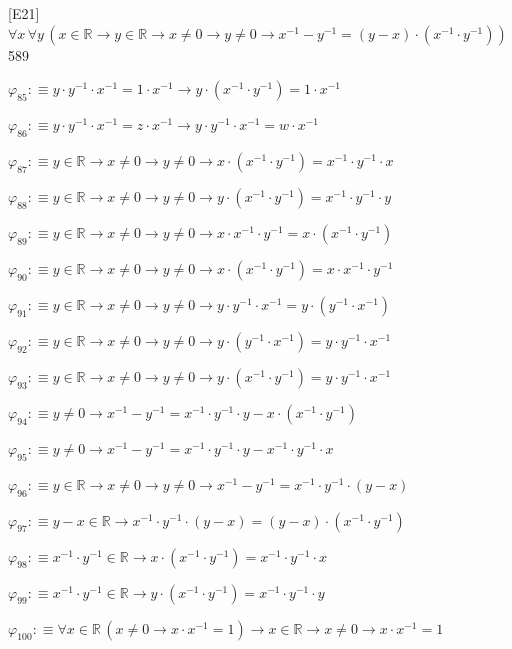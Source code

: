 \begin{fullproof}{[E21]}{$\forall x\,\forall y\,(x \in \mathbb{R} \to y \in \mathbb{R} \to x \neq 0 \to y \neq 0 \to x^{-1} - y^{-1} = (y - x) \cdot (x^{-1} \cdot y^{-1}))$}{589}
\begin{abbrevlist}
\item $\varphi_{85} :\equiv y \cdot y^{-1} \cdot x^{-1} = 1 \cdot x^{-1} \to y \cdot (x^{-1} \cdot y^{-1}) = 1 \cdot x^{-1}$
\item $\varphi_{86} :\equiv y \cdot y^{-1} \cdot x^{-1} = z \cdot x^{-1} \to y \cdot y^{-1} \cdot x^{-1} = w \cdot x^{-1}$
\item $\varphi_{87} :\equiv y \in \mathbb{R} \to x \neq 0 \to y \neq 0 \to x \cdot (x^{-1} \cdot y^{-1}) = x^{-1} \cdot y^{-1} \cdot x$
\item $\varphi_{88} :\equiv y \in \mathbb{R} \to x \neq 0 \to y \neq 0 \to y \cdot (x^{-1} \cdot y^{-1}) = x^{-1} \cdot y^{-1} \cdot y$
\item $\varphi_{89} :\equiv y \in \mathbb{R} \to x \neq 0 \to y \neq 0 \to x \cdot x^{-1} \cdot y^{-1} = x \cdot (x^{-1} \cdot y^{-1})$
\item $\varphi_{90} :\equiv y \in \mathbb{R} \to x \neq 0 \to y \neq 0 \to x \cdot (x^{-1} \cdot y^{-1}) = x \cdot x^{-1} \cdot y^{-1}$
\item $\varphi_{91} :\equiv y \in \mathbb{R} \to x \neq 0 \to y \neq 0 \to y \cdot y^{-1} \cdot x^{-1} = y \cdot (y^{-1} \cdot x^{-1})$
\item $\varphi_{92} :\equiv y \in \mathbb{R} \to x \neq 0 \to y \neq 0 \to y \cdot (y^{-1} \cdot x^{-1}) = y \cdot y^{-1} \cdot x^{-1}$
\item $\varphi_{93} :\equiv y \in \mathbb{R} \to x \neq 0 \to y \neq 0 \to y \cdot (x^{-1} \cdot y^{-1}) = y \cdot y^{-1} \cdot x^{-1}$
\item $\varphi_{94} :\equiv y \neq 0 \to x^{-1} - y^{-1} = x^{-1} \cdot y^{-1} \cdot y - x \cdot (x^{-1} \cdot y^{-1})$
\item $\varphi_{95} :\equiv y \neq 0 \to x^{-1} - y^{-1} = x^{-1} \cdot y^{-1} \cdot y - x^{-1} \cdot y^{-1} \cdot x$
\item $\varphi_{96} :\equiv y \in \mathbb{R} \to x \neq 0 \to y \neq 0 \to x^{-1} - y^{-1} = x^{-1} \cdot y^{-1} \cdot (y - x)$
\item $\varphi_{97} :\equiv y - x \in \mathbb{R} \to x^{-1} \cdot y^{-1} \cdot (y - x) = (y - x) \cdot (x^{-1} \cdot y^{-1})$
\item $\varphi_{98} :\equiv x^{-1} \cdot y^{-1} \in \mathbb{R} \to x \cdot (x^{-1} \cdot y^{-1}) = x^{-1} \cdot y^{-1} \cdot x$
\item $\varphi_{99} :\equiv x^{-1} \cdot y^{-1} \in \mathbb{R} \to y \cdot (x^{-1} \cdot y^{-1}) = x^{-1} \cdot y^{-1} \cdot y$
\item $\varphi_{100} :\equiv \forall x \in \mathbb{R}\,(x \neq 0 \to x \cdot x^{-1} = 1) \to x \in \mathbb{R} \to x \neq 0 \to x \cdot x^{-1} = 1$

\end{abbrevlist}
\end{fullproof}
